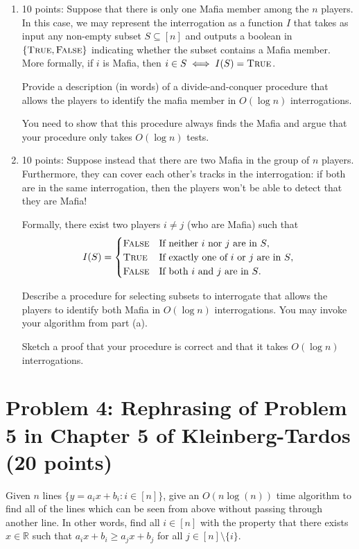 \documentclass[12pt]{article}
\begin{document}
\begin{enumerate}
    \item[(a)] 10 points: Suppose that there is only one Mafia member among the $n$ players.
    In this case, we may represent the interrogation as a function $I$ that takes as input any non-empty subset $S \subseteq [n]$ and outputs a boolean in $\{\textsc{True}, \textsc{False}\}$ indicating whether the subset contains a Mafia member. More formally, if $i$ is Mafia, then $i \in S \iff I(S) = \textsc{True}$. 
    
    Provide a description (in words) of a divide-and-conquer procedure that allows the players to identify the mafia member in $O(\log n)$ interrogations. 
    
    You need to show that this procedure always finds the Mafia and argue that your procedure  only takes $O(\log n)$ tests.
    \item[(b)] 10 points: Suppose instead that there are two Mafia in the group of $n$ players. Furthermore, they can cover each other's tracks in the interrogation: if both are in the same interrogation, then the players won't be able to detect that they are Mafia!

Formally, there exist two players $i \neq j$ (who are Mafia) such that
    \[
    I(S) = 
    \begin{cases}
        \textsc{False} & \text{If neither $i$ nor $j$ are in $S$}, \\
        \textsc{True} & \text{If exactly one of $i$ or $j$ are in $S$}, \\
        \textsc{False} & \text{If both $i$ and $j$ are in $S$}. \\
    \end{cases}
    \]

Describe a procedure for selecting subsets to interrogate that allows the players to identify both Mafia in $O(\log n)$ interrogations. You may invoke your algorithm from part (a).
 
    Sketch a proof that your procedure is correct and that it takes $O(\log n)$ interrogations.
\end{enumerate}

    
\section*{Problem 4: Rephrasing of Problem 5 in Chapter 5 of Kleinberg-Tardos (20 points)}
Given $n$ lines $\{y = {a_i}x + b_i: i \in [n]\}$, give an $O(n \log(n))$ time algorithm to find all of the lines which can be seen from above without passing through another line. In other words, find all $i \in [n]$ with the property that there exists $x \in \mathbb{R}$ such that  ${a_i}x + b_i \geq {a_j}x + b_j$ for all $j \in [n] \setminus \{i\}$.
\end{document}

